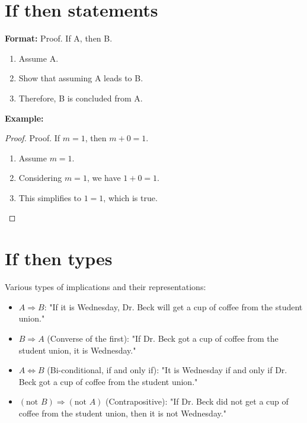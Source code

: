\section*{If then statements}
\textbf{Format:} Proof. If A, then B.
\begin{enumerate}
    \item Assume A.
    \item Show that assuming A leads to B.
    \item Therefore, B is concluded from A.
\end{enumerate}
\textbf{Example:} 
\begin{proof}
Proof. If \(m = 1\), then \(m + 0 = 1\).
\begin{enumerate}
    \item Assume \(m = 1\).
    \item Considering \(m = 1\), we have \(1 + 0 = 1\).
    \item This simplifies to \(1 = 1\), which is true.
\end{enumerate}
\end{proof}

\section*{If then types}
Various types of implications and their representations:
\begin{itemize}
    \item \(A \Rightarrow B\): "If it is Wednesday, Dr. Beck will get a cup of coffee from the student union."
    \item \(B \Rightarrow A\) (Converse of the first): "If Dr. Beck got a cup of coffee from the student union, it is Wednesday."
    \item \(A \Leftrightarrow B\) (Bi-conditional, if and only if): "It is Wednesday if and only if Dr. Beck got a cup of coffee from the student union."
    \item \((\text{not } B) \Rightarrow (\text{not } A)\) (Contrapositive): "If Dr. Beck did not get a cup of coffee from the student union, then it is not Wednesday."
\end{itemize}

